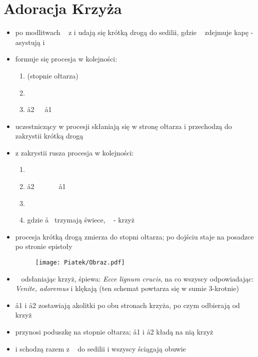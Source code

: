 \section{Adoracja Krzyża}

\begin{itemize}
    \item po modlitwach \ii~ z  i  udają się krótką drogą do sedilii,
          gdzie \ii~ zdejmuje kapę - asystują  i 
    \item formuje się procesja w kolejności:

          \begin{enumerate}\centering
              \item[] (stopnie ołtarza)
              \item[] ~~~\ii~~~~
              \item[] \aa2~~~\aa1
          \end{enumerate}

    \item uczestniczący w procesji skłaniają się w stronę ołtarza i przechodzą
          do zakrystii krótką drogą

    \item z zakrystii rusza procesja w kolejności:

          \begin{enumerate}\centering
              \item[] ~~~
              \item[] \aa2~~~\ii~~~~\aa1
              \item[]
              \item[] gdzie \aa~ trzymają świece, \ii~ - krzyż
          \end{enumerate}

    \item procesja krótką drogą zmierza do stopni ołtarza; po dojściu staje na
          posadzce po stronie epistoły

          \begin{figure}[h]
              \centering
              \texttt{[image: Piatek/Obraz.pdf]}
          \end{figure}

    \item \ii~ odsłaniając krzyż, śpiewa: \textit{Ecce lignum crucis}, na co
          wszyscy odpowiadając: \textit{Venite, adoremus} i klękają (ten schemat
          powtarza się w sumie 3-krotnie)
    \item \aa1 i \aa2 zostawiają akolitki po obu stronach krzyża, po czym
          odbierają od \ii~ krzyż
    \item {} przynosi poduszkę na stopnie ołtarza; \aa1 i \aa2 kładą na nią
          krzyż
    \item {} i  schodzą razem z \ii~ do sedilii i wszyscy ściągają obuwie


\end{itemize}
